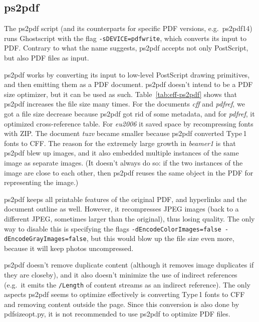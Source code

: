 \documentclass{ltugproc}
\def\cmd{\textsf}
\begin{document}
\subsection{ps2pdf}

The \cmd{ps2pdf} \cite{ps2pdf} script (and its counterparts for specific PDF
versions, e.g.\ \cmd{ps2pdf14}) runs Ghostscript with the flag
\texttt{-sDEVICE=pdfwrite}, which converts its input to PDF. Contrary to
what the name suggests, \cmd{ps2pdf} accepts not only PostScript, but also
PDF files as input.

\cmd{ps2pdf} works by converting its input to low-level PostScript drawing
primitives, and then emitting them as a PDF document. \cmd{ps2pdf} doesn't
intend to be a PDF size optimizer, but it can be used as such.
Table~\ref{tab:eff-ps2pdf} shows that \cmd{ps2pdf} increases the file size
many times. For the documents \emph{cff} and \emph{pdfref}, we got a file
size decrease because \cmd{ps2pdf} got rid of some metadata, and for
\emph{pdfref}, it optimized cross-reference table. For \emph{eu2006} it
saved space by recompressing fonts with ZIP. The document \emph{tuzv} became
smaller because \cmd{ps2pdf} converted Type\,1 fonts to CFF. The reason for
the extremely large growth in \emph{beamer1} is that \cmd{ps2pdf} blew up
images, and it also embedded multiple instances of the same image as
separate images. (It doesn't always do so: if the two instances of the image
are close to each other, then \cmd{ps2pdf} reuses the same object in the PDF
for representing the image.)

\cmd{ps2pdf} keeps all printable features of the original PDF, and
hyperlinks and the document outline as well. However, it recompresses JPEG
images (back to a different JPEG, sometimes larger than the original), thus
losing quality. The only way to disable this is specifying the flags
\texttt{-dEncodeColorImages=false -dEncodeGrayImages=false}, but this would
blow up the file size even more, because it will keep photos uncompressed.

\cmd{ps2pdf} doesn't remove duplicate content (although it
removes image duplicates if they are closeby), and it also doesn't minimize
the use of indirect references (e.g.\ it emits the \texttt{/Length} of
content streams as an indirect reference). The only aspects \cmd{ps2pdf}
seems to optimize effectively is converting Type\,1 fonts to CFF and
removing content outside the page. Since this
conversion is also done by \cmd{pdfsizeopt.py}, it is
not recommended to use \cmd{ps2pdf} to optimize PDF files.
\end{document}
